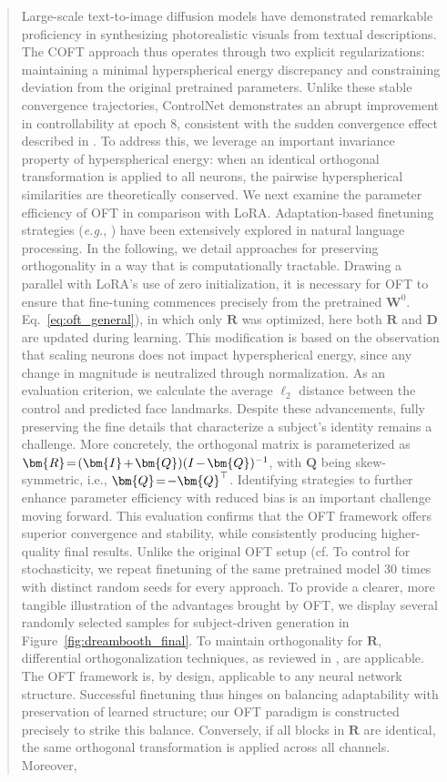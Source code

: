 {\begin{abstract}
Large-scale text-to-image diffusion models have demonstrated remarkable proficiency in synthesizing photorealistic visuals from textual descriptions. The COFT approach thus operates through two explicit regularizations: maintaining a minimal hyperspherical energy discrepancy and constraining deviation from the original pretrained parameters. Unlike these stable convergence trajectories, ControlNet demonstrates an abrupt improvement in controllability at epoch 8, consistent with the sudden convergence effect described in \cite{zhang2023adding}. To address this, we leverage an important invariance property of hyperspherical energy: when an identical orthogonal transformation is applied to all neurons, the pairwise hyperspherical similarities are theoretically conserved. We next examine the parameter efficiency of OFT in comparison with LoRA. Adaptation-based finetuning strategies (\emph{e.g.}, \cite{hulora2022,houlsby2019parameter,pfeiffer2020adapterfusion}) have been extensively explored in natural language processing. In the following, we detail approaches for preserving orthogonality in a way that is computationally tractable. Drawing a parallel with LoRA’s use of zero initialization, it is necessary for OFT to ensure that fine-tuning commences precisely from the pretrained $\bm{W}^0$. Eq.~\eqref{eq:oft_general}), in which only $\bm{R}$ was optimized, here both $\bm{R}$ and $\bm{D}$ are updated during learning. This modification is based on the observation that scaling neurons does not impact hyperspherical energy, since any change in magnitude is neutralized through normalization. As an evaluation criterion, we calculate the average $\ell_2$ distance between the control and predicted face landmarks. Despite these advancements, fully preserving the fine details that characterize a subject’s identity remains a challenge. More concretely, the orthogonal matrix is parameterized as $\thickmuskip=2mu \medmuskip=2mu \bm{R}=(\bm{I}+\bm{Q})(I-\bm{Q})^{-1}$, with $\bm{Q}$ being skew-symmetric, i.e., $\thickmuskip=2mu \medmuskip=2mu \bm{Q}=-\bm{Q}^\top$. Identifying strategies to further enhance parameter efficiency with reduced bias is an important challenge moving forward. This evaluation confirms that the OFT framework offers superior convergence and stability, while consistently producing higher-quality final results. Unlike the original OFT setup (cf. To control for stochasticity, we repeat finetuning of the same pretrained model 30 times with distinct random seeds for every approach. To provide a clearer, more tangible illustration of the advantages brought by OFT, we display several randomly selected samples for subject-driven generation in Figure~\ref{fig:dreambooth_final}. To maintain orthogonality for $\bm{R}$, differential orthogonalization techniques, as reviewed in \cite{liu2021orthogonal,lezcano2019cheap}, are applicable. The OFT framework is, by design, applicable to any neural network structure. Successful finetuning thus hinges on balancing adaptability with preservation of learned structure; our OFT paradigm is constructed precisely to strike this balance. Conversely, if all blocks in $\bm{R}$ are identical, the same orthogonal transformation is applied across all channels. Moreover, 
\end{abstract}}
